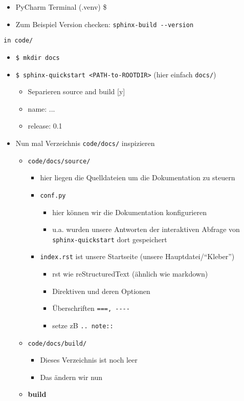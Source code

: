 \begin{itemize}
	\item
	PyCharm Terminal (.venv) \$
	\item
	Zum Beispiel Version checken: \texttt{sphinx-build\ -\/-version}
\end{itemize}
%
\texttt{in \texttt{code/}}
\begin{itemize}
	\item \texttt{\$ mkdir docs}
	\item \texttt{\$ sphinx-quickstart\ \textless{}PATH-to-ROOTDIR\textgreater{}}
	(hier einfach \texttt{docs/})
	\begin{itemize}
		\item Separieren source and build [y]
		\item name: ...
		\item release: 0.1
	\end{itemize}
	\item Nun mal	Verzeichnis \texttt{code/docs/} inspizieren
	\begin{itemize}

		\item
		\texttt{code/docs/source/}
		\begin{itemize}

			\item
			hier liegen die Quelldateien um die Dokumentation zu steuern
			\item
			\texttt{conf.py}

			\begin{itemize}

				\item
				hier können wir die Dokumentation konfigurieren
				\item
				u.a. wurden unsere Antworten der interaktiven Abfrage von \texttt{sphinx-quickstart} dort gespeichert
			\end{itemize}
			\item
			\texttt{index.rst} ist unsere Startseite (unsere Hauptdatei/``Kleber'')
			\begin{itemize}

				\item
				rst wie reStructuredText (ähnlich wie markdown)
				\item
				Direktiven und deren Optionen
				\item
				Überschriften \texttt{===,\ -\/-\/-\/-}
				\item
				setze zB \texttt{..\ note::}
			\end{itemize}
		\end{itemize}
		\item
		\texttt{code/docs/build/}
		\begin{itemize}
			\item Dieses Verzeichnis ist noch leer
			\item Das ändern wir nun
		\end{itemize}
		\item
	\textbf{build}


\end{itemize}
\end{itemize}
